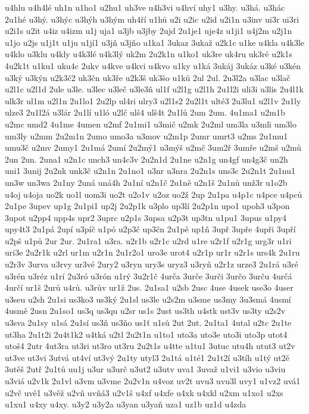 u4hlu
u4h4lé
uh1n
u1ho1
u2hu1
uh3ve
u4h3vi
u4hví
uhy1
u3hy.
u3há.
u3hác
2u1hé
u3hý.
u3hýc
u3hýh
u3hým
uh4ří
u1hů
u2i
u2ic
u2id
u2i1n
u3inv
ui3r
ui3ri
u2i1s
u2it
u4iz
u4izm
u1j
uja1
u3jb
u3jby
2ujd
2u1je1
uje4z
u1ji1
u4j2m
u2j1n
u1jo
u2js
u1j1t
u1ju
u1jí1
u3jň
u3jňo
u1ka1
3ukaz
3ukaž
u2k1c
u1ke
u4kla
u4k3le
u4klo
u3klu
u4kly
u4k3lé
u4k3lý
uk2m
2u2k1n
u1ko1
uk3re
uk4ru
uk3ré
u2k1s
4u2k1t
u1ku1
uku4c
2ukv
u4kve
u4kvi
u4kvo
u1ky
u1ká
3ukáj
3ukáz
u3ké
u3kén
u3ký
u3kýn
u2k3č2
uk3čn
uk3ře
u2k3š
uk3šo
u1ků
2ul
2ul.
2u3l2a
u3lac
u3lač
u2l1c
u2l1d
2ule
u3le.
u3lec
u3leč
u3le3ň
ul1f
u2l1g
u2l1h
2u1l2i
uli3i
u3lis
2u4l1k
ulk3r
ul1m
u2l1n
2u1lo1
2u2lp
ul4ri
ulry3
u2l1s2
2u2l1t
ulté3
2u3lu1
u2l1v
2u1ly
ulze3
2u1l2á
u3lár
2u1lí
u1ló
u2lč
ulš4
ulš4t
2u1lů
2um
2um.
4u1ma1
u2m1b
u2mc
umd2
4u1me
4umen
u2mf
2u1mi1
u3mič
u2mk
2u2ml
um3la
u3mli
um3lo
um3ly
u2mm
2u2m1n
2umo
umo3a
u3mov
u2m1p
2umr
umrt3
u2ms
2u1mu1
umu3č
u2mv
2umy1
2u1má
2umí
2u2mý1
u3mýš
u2mč
3um2ř
3umře
u2mš
u2mů
2un
2un.
2una1
u2n1c
unch3
un4c3v
2u2n1d
2u1ne
u2n1g
un4gf
un4g3č
un2h
uni1
3unij
2u2nk
unk3č
u2n1n
2u1no1
u3nr
u3nra
2u2n1s
uns3c
2u2n1t
2u1nu1
un3w
un3wa
2u1ny
2uná
uná4h
2u1ní
u2n1č
2u1ně
u2n1š
2u1nů
unž3r
u1o2b
u4oj
u4oja
uo2k
uo1l
uom3i
uo2t
u2o1v
u2oz
uo2ž
2up
2u1pa
u4p1c
u4pce
u4pců
2u1pe
3upev
up1g
2u1pi1
up2j
2u2p1k
u3plo
up3lí
2u2p1n
upo1
upoh3
u3pon
3upot
u2pp4
upp4s
upr2
3uprc
u2p1s
3upsa
u2p3t
up3tn
u1pu1
3upus
u1py4
upy4t3
2u1pá
2upí
u3píč
u1pó
u2p3č
up3čn
2u1pě
up1ň
3upř
3upře
4upři
3upří
u2pš
u1pů
2ur
2ur.
2u1ra1
u3ra.
u2r1b
u2r1c
u2rd
u1re
u2r1f
u2r1g
urg3r
u1ri
uri3e
2u2r1k
u2rl
ur1m
u2r1n
2u1r2o1
uro3e
urot4
u2r1p
ur1r
u2r1s
urs4k
2u1ru
u2r3v
3urva
u3rvy
ur3vé
2ury2
u3ryn
ury3s
uryz3
u3ryň
u2r1z
urze3
2u1rá
u3ré
u3rén
u3réz
u1rí
2u3ró
u3rón
u1rý
3u2r1č
4urča
3urče
3urči
3určo
3urču
4určá
4určí
ur1š
2urů
u4rů.
u3rův
ur1ž
2us.
2u1sa1
u2sb
2usc
4use
4usek
use3o
4user
u3seu
u2sh
2u1si
us3ko3
us3ký
2u1sl
us3le
u2s2m
u3sme
us3my
3u3smá
4usmí
4usmě
2usn
2u1so1
us3q
us3qu
u2sr
us1s
2ust
us3th
u4stk
ust3v
us3ty
u2s2v
u3sva
2u1sy
u1sá
2u1sí
us3ň
us3ňo
us1ť
u1sů
2ut
2ut.
2u1ta1
4utal
u2tc
2u1te
ut3ha
2u1t2i
2u4t1k2
u4tká
u2tl
2u2t1n
u1to1
uto3a
uto3e
uto3i
uto3p
utot4
utoš4
2utr
4ut3ra
ut3ri
ut3ro
ut3ru
2u2t1s
u4tte
u1tu1
3utuc
utu4h
utut3
ut2v
ut3ve
ut3vi
3utvá
ut4ví
ut3vý
2u1ty
utyl3
2u1tá
u1té1
2u1t2í
u3tíh
u1tý
ut2ě
3utěš
2utř
2u1tů
uu1j
u3ur
u3urč
u3ut2
u3utv
uva1
3uvaž
u1vi1
u3vio
u3viu
u3viá
u2v1k
2u1vl
u3vm
u3vme
2u2v1n
u4voz
uv2t
uvu3
uvu3l
uvy1
u1vz2
uvá1
u2vč
uvě1
u3věž
u2vň
uvňá3
u2v1š
u4xf
u4xfe
u4xk
u4xkl
u2xm
u1xo1
u2xs
u1xu1
u4xy
u4xy.
u3y2
u3y2a
u3yan
u3yaň
uza1
uz1b
uz1d
u4zda
